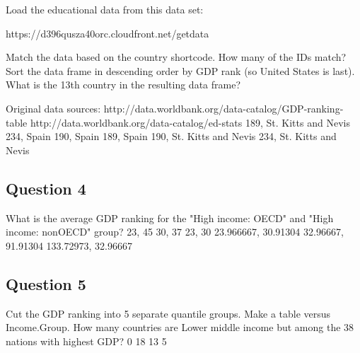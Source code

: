 Load the educational data from this data set: 

https://d396qusza40orc.cloudfront.net/getdata%

Match the data based on the country shortcode. How many of the IDs match? Sort the data frame in descending order by GDP rank (so United States is last). What is the 13th country in the resulting data frame? 

Original data sources: 
http://data.worldbank.org/data-catalog/GDP-ranking-table 
http://data.worldbank.org/data-catalog/ed-stats
189, St. Kitts and Nevis
234, Spain
190, Spain
189, Spain
190, St. Kitts and Nevis
234, St. Kitts and Nevis

\subsection{Question 4}
What is the average GDP ranking for the "High income: OECD" and "High income: nonOECD" group?
23, 45
30, 37
23, 30
23.966667, 30.91304
32.96667, 91.91304
133.72973, 32.96667
\subsection{Question 5}
Cut the GDP ranking into 5 separate quantile groups. Make a table versus Income.Group. How many countries are Lower middle income but among the 38 nations with highest GDP?
0
18
13
5
